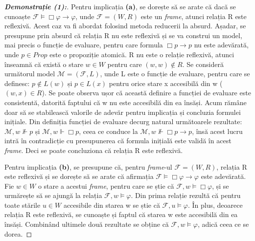 \documentclass[12pt, openany]{book}
\begin{document}
            \begin{proof}[\textbf{Demonstrație (1):}]
                Pentru implicația \textbf{(a)}, se dorește să se arate că dacă se cunoaște $\mathcal{F} \vDash \Box \varphi 
                \rightarrow \varphi$, unde $\mathcal{F}=(W,R)$ este un \textit{frame}, atunci relația R este reflexivă. 
                Acest caz va fi abordat folosind metoda reducerii la absurd. Așadar, se presupune prin absurd că relația R
                nu este reflexivă și se va construi un model, mai precis o funcție de evaluare, pentru care formula $\Box p 
                \rightarrow p$ nu este adevărată, unde $p \in Prop$ este o propoziție atomică. R nu este o relație 
                reflexivă, atunci înseamnă că există o stare $w \in W$ pentru care $(w,w) \notin R$. Se consideră următorul 
                model $\mathcal{M}=(\mathcal{F},L)$, unde L este o funcție de evaluare, pentru care se definesc: $p \notin 
                L(w)$ și $p \in L(x)$ pentru orice stare x accesibilă din w ($(w,x) \in R$). Se poate observa ușor că 
                această definire a funcției de evaluare este consistentă, datorită faptului că w nu este accesibilă din ea 
                însăși. Acum rămâne doar să se stabilească valorile de adevăr pentru implicația și concluzia formulei 
                inițiale. Din definiția funcției de evaluare decurg natural următoarele rezultate: $\mathcal{M},w \nVdash p$
                și $\mathcal{M},w \Vdash \Box p$, ceea ce conduce la $\mathcal{M},w \nVdash \Box p \rightarrow p$, însă 
                acest lucru intră în contradicție cu presupunerea că formula inițială este validă în acest \textit{frame}. 
                Deci se poate concluziona că relația R este reflexivă.

                Pentru implicația \textbf{(b)}, se presupune că, pentru \textit{frame}-ul $\mathcal{F}=(W,R)$, relația R 
                este reflexivă și se dorește să se arate că afirmația $\mathcal{F} \vDash \Box \varphi \rightarrow \varphi$ 
                este adevărată. Fie $w \in W$ o stare a acestui \textit{frame}, pentru care se știe că $\mathcal{F},w \vDash
                \Box \varphi$, și se urmărește să se ajungă la relația $\mathcal{F},w \vDash \varphi$. Din prima relație 
                rezultă că pentru toate stările $u \in W$ accesibile din starea w se știe că $\mathcal{F},u \vDash \varphi$.
                În plus, deoarece relația R este reflexivă, se cunoaște și faptul că starea w este accesibilă din ea însăși.
                Combinând ultimele două rezultate se obține că $\mathcal{F},w \vDash \varphi$, adică ceea ce se dorea.
            \end{proof}
\end{document}
